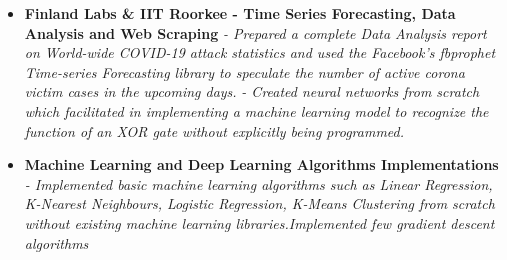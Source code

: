 \documentclass{article}
\begin{document}
\begin{itemize}
    \item{\textbf{\large{Finland Labs \& IIT Roorkee - Time Series Forecasting, Data Analysis and Web Scraping}}}
          \newline
          \textit{- Prepared a complete Data Analysis report on World-wide COVID-19 attack statistics and used the Facebook's fbprophet Time-series Forecasting library to speculate the number of active corona victim cases in the upcoming days.}\newline
          \textit{- Created neural networks from scratch which facilitated in implementing a machine learning model to recognize the function of an XOR gate without explicitly being programmed.}%
    \item{\textbf{\large{Machine Learning and Deep Learning Algorithms Implementations}}}
          \newline
          \textit{- Implemented basic machine learning algorithms such as Linear Regression, K-Nearest Neighbours, Logistic Regression, K-Means Clustering from scratch without existing machine learning libraries.Implemented few gradient descent algorithms
          }
          \newline



\end{itemize}
\end{document}

